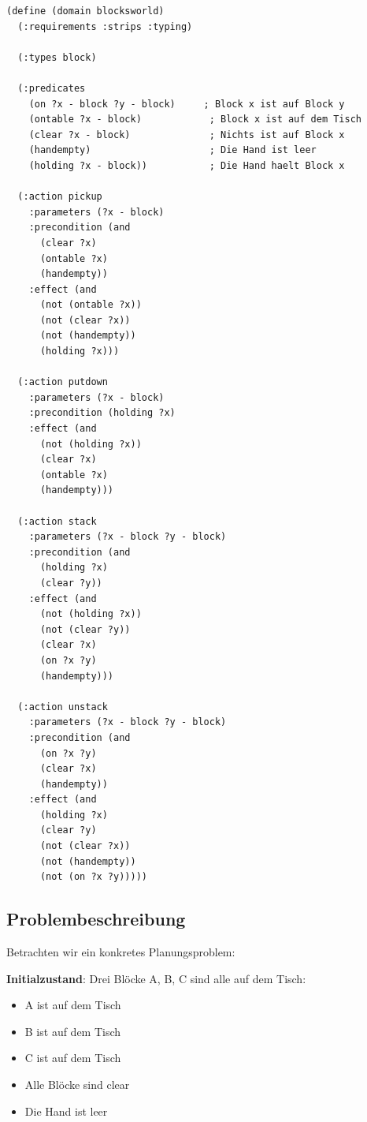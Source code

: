 ﻿\documentclass[a4paper,12pt]{article}
\theoremstyle{definition}
\begin{document}
\begin{lstlisting}[language=PDDL, caption=Blocksworld Domäne]
(define (domain blocksworld)
  (:requirements :strips :typing)
  
  (:types block)
  
  (:predicates
    (on ?x - block ?y - block)     ; Block x ist auf Block y
    (ontable ?x - block)            ; Block x ist auf dem Tisch
    (clear ?x - block)              ; Nichts ist auf Block x
    (handempty)                     ; Die Hand ist leer
    (holding ?x - block))           ; Die Hand haelt Block x
  
  (:action pickup
    :parameters (?x - block)
    :precondition (and
      (clear ?x)
      (ontable ?x)
      (handempty))
    :effect (and
      (not (ontable ?x))
      (not (clear ?x))
      (not (handempty))
      (holding ?x)))
  
  (:action putdown
    :parameters (?x - block)
    :precondition (holding ?x)
    :effect (and
      (not (holding ?x))
      (clear ?x)
      (ontable ?x)
      (handempty)))
  
  (:action stack
    :parameters (?x - block ?y - block)
    :precondition (and
      (holding ?x)
      (clear ?y))
    :effect (and
      (not (holding ?x))
      (not (clear ?y))
      (clear ?x)
      (on ?x ?y)
      (handempty)))
  
  (:action unstack
    :parameters (?x - block ?y - block)
    :precondition (and
      (on ?x ?y)
      (clear ?x)
      (handempty))
    :effect (and
      (holding ?x)
      (clear ?y)
      (not (clear ?x))
      (not (handempty))
      (not (on ?x ?y)))))
\end{lstlisting}

\subsection{Problembeschreibung}

Betrachten wir ein konkretes Planungsproblem:

\textbf{Initialzustand}: Drei Blöcke A, B, C sind alle auf dem Tisch:
\begin{itemize}
	\item[-] A ist auf dem Tisch
	\item[-] B ist auf dem Tisch
	\item[-] C ist auf dem Tisch
	\item[-] Alle Blöcke sind clear
	\item[-] Die Hand ist leer
\end{itemize}
\end{document}

